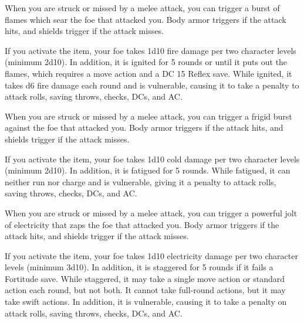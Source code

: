  When you are struck or missed by a melee attack, you can trigger a burst of flames which sear the foe that attacked you. Body armor triggers if the attack hits, and shields trigger if the attack misses.

If you activate the item, your foe takes 1d10 fire damage per two character levels (minimum 2d10). In addition, it is ignited for 5 rounds or until it puts out the flames, which requires a move action and a DC 15 Reflex save. While ignited, it takes d6 fire damage each round and is vulnerable, causing it to take a  penalty to attack rolls, saving throws, checks, DCs, and AC.


 When you are struck or missed by a melee attack, you can trigger a frigid burst against the foe that attacked you. Body armor triggers if the attack hits, and shields trigger if the attack misses.

If you activate the item, your foe takes 1d10 cold damage per two character levels (minimum 2d10). In addition, it is fatigued for 5 rounds. While fatigued, it can neither run nor charge and is vulnerable, giving it a  penalty to attack rolls, saving throws, checks, DCs, and AC.


 When you are struck or missed by a melee attack, you can trigger a powerful jolt of electricity that zaps the foe that attacked you. Body armor triggers if the attack hits, and shields trigger if the attack misses.

If you activate the item, your foe takes 1d10 electricity damage per two character levels (minimum 3d10). In addition, it is staggered for 5 rounds if it fails a Fortitude save. While staggered, it may take a single move action or standard action each round, but not both. It cannot take full-round actions, but it may take swift actions. In addition, it is vulnerable, causing it to take a  penalty on attack rolls, saving throws, checks, DCs, and AC.


